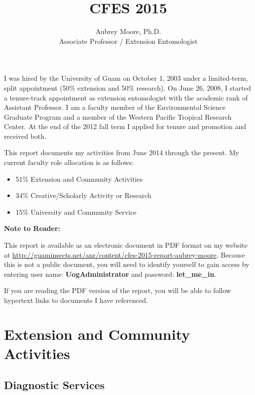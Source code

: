 \documentclass[12pt,oneside,english]{scrbook}
\begin{document}

\title{CFES 2015}
\author{Aubrey Moore, Ph.D.\\
Associate Professor / Extension Entomologist}
\maketitle

I was hired by the University of Guam on October 1, 2003 under a limited-term,
split appointment (50\% extension and 50\% research). On June 26,
2008, I started a tenure-track appointment as extension entomologist
with the academic rank of Assistant Professor. I am a faculty member
of the Environmental Science Graduate Program and a member of the
Western Pacific Tropical Research Center. At the end of the 2012 fall
term I applied for tenure and promotion and received both.

This report documents my activities from June 2014 through the present.
My current faculty role allocation is as follows:
\begin{itemize}
	\item 51\% Extension and Community Activities 
	\item 34\% Creative/Scholarly Activity or Research 
	\item 15\% University and Community Service
\end{itemize}

\textbf{Note to Reader:}

This report is available as an electronic document in PDF format on
my website at \url{http://guaminsects.net/anr/content/cfes-2015-report-aubrey-moore}.
Because this is not a public document, you will need to identify yourself
to gain access by entering user name: \textbf{UogAdministrator} and
password: \textbf{let\_me\_in}. 

If you are reading the PDF version of the report, you will be able
to follow hypertext links to documents I have referenced. 

\tableofcontents{}

\listoftables

\chapter{Extension and Community Activities}

\section{Diagnostic Services}
\end{document}

